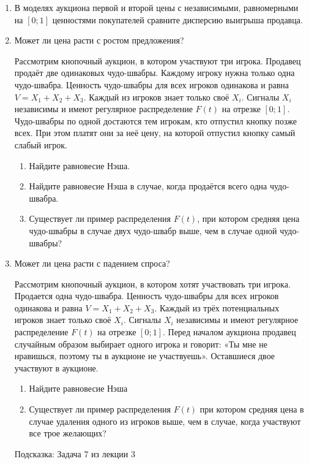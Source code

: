 \begin{enumerate}
\item В моделях аукциона первой и второй цены с независимыми, равномерными на $ [0;1] $ ценностями покупателей сравните дисперсию выигрыша продавца.


\item Может ли цена расти с ростом предложения?

Рассмотрим кнопочный аукцион, в котором участвуют три игрока. Продавец продаёт две одинаковых чудо-швабры. Каждому игроку нужна только одна чудо-швабра. Ценность чудо-швабры для всех игроков одинакова и равна $ V=X_{1}+X_{2}+X_{3} $. Каждый из игроков знает только своё $ X_{i} $. Сигналы $ X_{i} $ независимы и имеют регулярное распределение $ F(t) $ на отрезке $ [0;1] $. Чудо-швабры по одной достаются тем игрокам, кто отпустил кнопку позже всех. При этом платят они за неё цену, на которой отпустил кнопку самый слабый игрок.

\begin{enumerate}
\item Найдите равновесие Нэша.
\item Найдите равновесие Нэша в случае, когда продаётся всего одна чудо-швабра.
\item Существует ли пример распределения $ F(t) $, при котором средняя цена чудо-швабры в  случае двух чудо-швабр выше, чем в случае одной чудо-швабры?
\end{enumerate}



\item Может ли цена расти с падением спроса?

Рассмотрим кнопочный аукцион, в котором хотят участвовать три игрока. Продается одна чудо-швабра. Ценность чудо-швабры для всех игроков одинакова и равна $ V=X_{1}+X_{2}+X_{3} $. Каждый из трёх потенциальных игроков знает только своё $ X_{i} $. Сигналы $ X_{i} $ независимы и имеют регулярное распределение $ F(t) $ на отрезке $ [0;1] $. Перед началом аукциона продавец случайным образом выбирает одного игрока и говорит: «Ты мне не нравишься, поэтому ты в аукционе не участвуешь». Оставшиеся двое участвуют в аукционе.

\begin{enumerate}
\item Найдите равновесие Нэша
\item Существует ли пример распределения $ F(t) $ при котором средняя цена в случае удаления одного из игроков выше, чем в случае, когда участвуют все трое желающих?
\end{enumerate}

Подсказка: Задача 7 из лекции 3




\end{enumerate}
